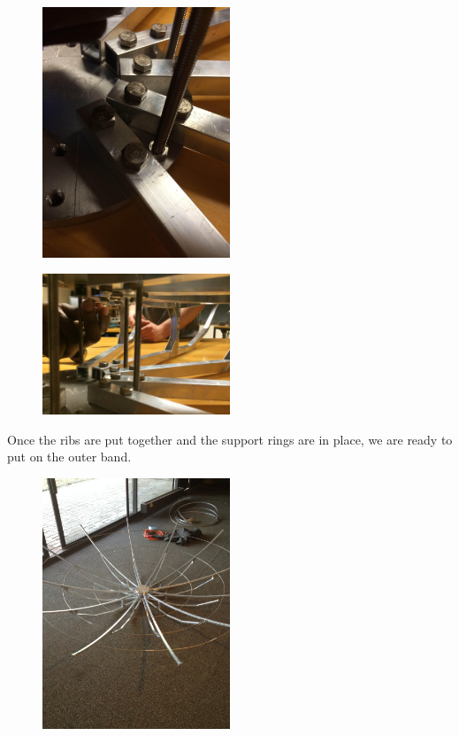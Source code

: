 \documentclass[11pt]{article} %
\begin{document}
\begin{figure}
  \centering
  \caption{   }
  \includegraphics[width=0.50\textwidth]{dish/02.jpeg}
\end{figure}

\begin{figure}
  \centering
  \caption{   }
  \includegraphics[width=0.50\textwidth]{dish/03.jpeg}
\end{figure}

Once the ribs are put together and the support rings are in place, we are ready to put on the outer band.

\begin{figure}
  \centering
  \caption{   }
  \includegraphics[width=0.50\textwidth]{dish/04.jpeg}
\end{figure}
\end{document}
